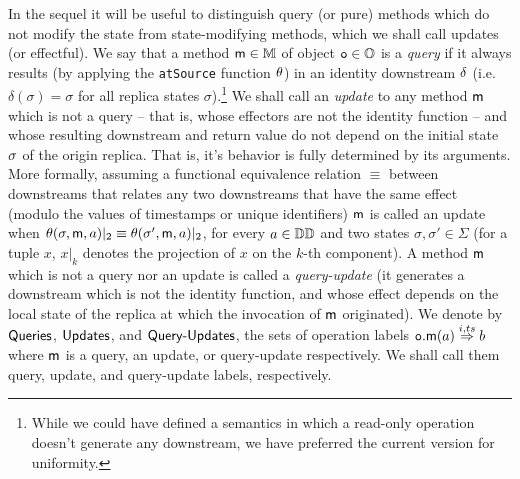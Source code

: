 In the sequel it will be useful to distinguish query (or pure) methods
which do not modify the state from state-modifying methods, which we
shall call updates (or effectful).
%
We say that a method $\mathsf{m}\in\mathbb{M}$ of object $\mathtt{o}\in \mathbb{O}$
is a \emph{query} if it always results (by applying the {\tt atSource}
function $\theta$) in an identity downstream $\delta$ (i.e.
$\delta(\sigma)=\sigma$ for all replica states
$\sigma$).\footnote{While we could have defined a semantics in which a
  read-only operation doesn't generate any downstream, we have preferred
  the current version for uniformity.}
We shall call an \emph{update} to any method $\mathsf{m}$ which is not a
query -- that is, whose effectors are not the identity function -- and
whose resulting downstream and return value do not depend on the
initial state $\sigma$ of the origin replica.
That is, it's behavior is fully determined by its arguments.
More formally, assuming a functional equivalence relation $\equiv$
between downstreams that relates any two downstreams that have the same
effect (modulo the values of timestamps or unique identifiers)
$\mathsf{m}$ is called an update when
$\theta(\sigma,\mathsf{m},a)|_2 \equiv
\theta(\sigma',\mathsf{m},a)|_2$, for every $a\in\mathbb{DD}$
and two states $\sigma,\sigma'\in\Sigma$ (for a tuple $x$, $x|_k$
denotes the projection of $x$ on the $k$-th component).
A method $\mathsf{m}$ which is not a query nor an update is called a
\emph{query-update} (it generates a downstream which is not the
identity function, and whose effect depends on the local state of the
replica at which the invocation of $\mathsf{m}$ originated).
We denote by $\mathsf{Queries}$, $\mathsf{Updates}$, and $\mathsf{Query\text{-}Updates}$, the sets of
operation labels ${{\mathtt{o}.\mathsf{m}}}(a) \overset{i,ts}{\Rightarrow} b$ where $\mathsf{m}$
is a query, an update, or query-update respectively.
We shall call them query, update, and query-update labels,
respectively.

